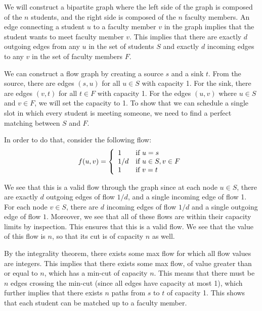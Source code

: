 \documentclass[psamsfonts]{amsart}
\newenvironment{sol}{\vspace{0.25cm}{\large \bfseries Solution:}}{\qedsymbol}
\begin{document}
\begin{sol}
We will construct a bipartite graph where the left side of the graph is composed of the $n$ students, and the right side is composed of the $n$ faculty members. An edge connecting a student $u$ to a faculty member $v$ in the graph implies that the student wants to meet faculty member $v$. This implies that there are exactly $d$ outgoing edges from any $u$ in the set of students $S$ and exactly $d$ incoming edges to any $v$ in the set of faculty members $F$. 

We can construct a flow graph by creating a source $s$ and a sink $t$. From the source, there are edges $(s,u)$ for all $u \in S$ with capacity 1. For the sink, there are edges $(v, t)$ for all $t \in F$ with capacity 1. For the edges $(u,v)$ where $u \in S$ and $v \in F$, we will set the capacity to 1. To show that we can schedule a single slot in which every student is meeting someone, we need to find a perfect matching between $S$ and $F$.

In order to do that, consider the following flow: 
\begin{eqnarray}
f(u,v) = \left\{\begin{array}{l l}
1 & \text{if } u = s \\
1/d & \text{if } u \in S, v \in F \\
1 & \text{if } v = t
\end{array}\right.
\end{eqnarray}

We see that this is a valid flow through the graph since at each node $u \in S$, there are exactly $d$ outgoing edges of flow $1/d$, and a single incoming edge of flow 1. For each node $v \in S$, there are $d$ incoming edges of flow $1/d$ and a single outgoing edge of flow $1$. Moreover, we see that all of these flows are within their capacity limits by inspection. This ensures that this is a valid flow. We see that the value of this flow is $n$, so that its cut is of capacity $n$ as well.

By the integrality theorem, there exists some max flow for which all flow values are integers. This implies that there exists some max flow, of value greater than or equal to $n$, which has a min-cut of capacity $n$. This means that there must be $n$ edges crossing the min-cut (since all edges have capacity at most 1), which further implies that there exists $n$ paths from $s$ to $t$ of capacity 1. This shows that each student can be matched up to a faculty member.
\end{sol}
\end{document}
